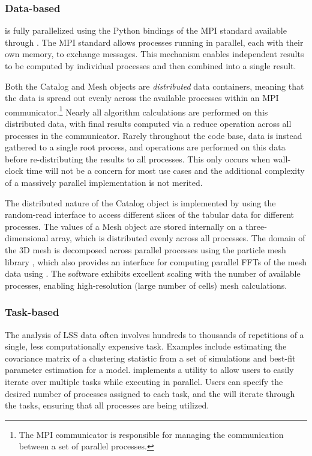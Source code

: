 \subsubsection{Data-based}

\nbkit{} is fully parallelized using the Python bindings of the MPI standard
available through \mpipy{}. The MPI standard allows processes running in
parallel, each with their own memory, to exchange messages. This mechanism
enables independent results to be computed
by individual processes and then combined into a single result.

Both the Catalog and Mesh objects are \textit{distributed} data containers,
meaning that the data is spread out evenly across the available processes
within an MPI communicator.\footnote{The MPI communicator is responsible for
managing the communication between a set of parallel processes.}
Nearly all algorithm calculations are performed on this distributed data,
with final results computed via a reduce operation across all
processes in the communicator. Rarely throughout the
code base, data is instead gathered to a
single root process, and operations are performed on this data before
re-distributing the results to all processes. This only occurs when
wall-clock time will not be a concern for most use cases and the additional
complexity of a massively parallel implementation is not merited.


The distributed nature of the Catalog object is implemented by using the
random-read interface to access different slices of the tabular data for
different processes. The values of a Mesh object are
stored internally on a three-dimensional \numpy{} array, which is distributed
evenly across all processes. The domain of the 3D mesh is decomposed across
parallel processes using the particle mesh library \pmesh{}, which
also provides an interface for computing parallel FFTs of the mesh data
using \pfftpython{}. The \pfftpython{} software exhibits excellent scaling
with the number of available processes, enabling high-resolution (large number
of cells) mesh calculations.

\subsubsection{Task-based}


The analysis of LSS data often involves hundreds to thousands of
repetitions of a single, less computationally expensive task.
Examples include estimating the covariance matrix of a clustering statistic
from a set of simulations and best-fit parameter estimation for a model.
 \nbkit{} implements a  utility to allow
users to easily iterate over multiple tasks while executing in parallel.
Users can specify the desired number of processes assigned to each task,
and the  will iterate through the tasks, ensuring that all
processes are being utilized.

